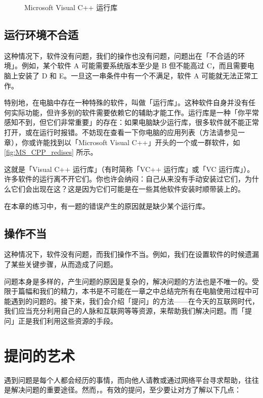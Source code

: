 \begin{figure}[htb!]
\begin{minipage}{.49\textwidth}
      \caption{Microsoft Visual C++ 运行库}
      \label{fig:MS_CPP_redises}
  \end{minipage}
\end{figure}

\subsection{运行环境不合适}

这种情况下，软件没有问题，我们的操作也没有问题，问题出在「不合适的环境」。例如，某个软件 A 可能需要系统版本至少是 B 但不能高过 C，而且需要电脑上安装了 D 和 E。一旦这一串条件中有一个不满足，软件 A 可能就无法正常工作。

特别地，在电脑中存在一种特殊的软件，叫做「运行库」。这种软件自身并没有任何实际功能，但许多别的软件需要依赖它的辅助才能工作。运行库是一种「你平常感知不到，但它们非常重要」的存在：如果电脑缺少运行库，很多软件就不能正常打开，或在运行时报错。不妨现在查看一下你电脑的应用列表（方法请参见一章），你或许能找到以「Microsoft Visual C++」开头的一个或一群软件，如\autoref{fig:MS_CPP_redises} 所示。

这就是「Visual C++ 运行库」（有时简称「VC++ 运行库」或「VC 运行库」）。许多软件的运行离不开它们。你也许会纳闷：自己从来没有手动安装过它们，为什么它们会出现在这？这是因为它们可能是在一些其他软件安装时顺带装上的。

在本章的练习中，有一题的错误产生的原因就是缺少某个运行库。

\subsection{操作不当}

这种情况下，软件没有问题，而我们操作不当。例如，我们在设置软件的时候遗漏了某些关键步骤，从而造成了问题。

问题本身是多样的，产生问题的原因是复杂的，解决问题的方法也是不唯一的。受限于篇幅和我们的精力，本书是不可能在一章之中总结完所有在电脑使用过程中可能遇到的问题的。接下来，我们会介绍「提问」的方法——在今天的互联网时代，我们应当充分利用自己的人脉和互联网等等资源，来帮助我们解决问题。而「提问」正是我们利用这些资源的手段。

\section{提问的艺术}

遇到问题是每个人都会经历的事情，而向他人请教或通过网络平台寻求帮助，往往是解决问题的重要途径。然而，。有效的提问，至少要让对方了解以下几点：

